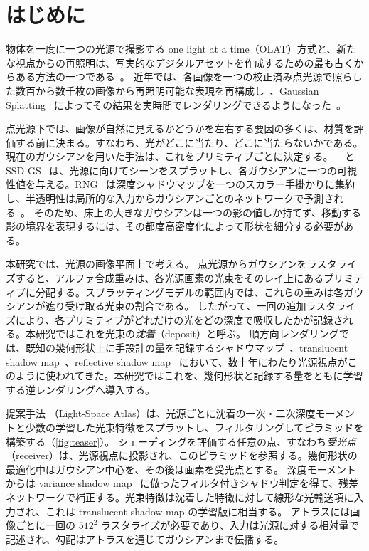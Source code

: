 \section{はじめに}
\label{sec:intro}

物体を一度に一つの光源で撮影する one light at a time（OLAT）方式と、新たな視点からの再照明は、写実的なデジタルアセットを作成するための最も古くからある方法の一つである~\cite{debevec2000acquiring}。
近年では、各画像を一つの校正済み点光源で照らした数百から数千枚の画像から再照明可能な表現を再構成し~\cite{bi2020neural,zeng2023nrhints}、Gaussian Splatting~\cite{kerbl20233d} によってその結果を実時間でレンダリングできるようになった~\cite{bi2024gs3,kuang2024olat,fan2025rng,liu2025bigs,zheng2026ssdgs}。

点光源下では、画像が自然に見えるかどうかを左右する要因の多くは、材質を評価する前に決まる。すなわち、光がどこに当たり、どこに当たらないかである。
現在のガウシアンを用いた手法は、これをプリミティブごとに決定する。
\gsthree~\cite{bi2024gs3} と SSD-GS~\cite{zheng2026ssdgs} は、光源に向けてシーンをスプラットし、各ガウシアンに一つの可視性値を与える。RNG~\cite{fan2025rng} は深度シャドウマップを一つのスカラー手掛かりに集約し、半透明性は局所的な入力からガウシアンごとのネットワークで予測される~\cite{dihlmann2024sss,zheng2026ssdgs}。
そのため、床上の大きなガウシアンは一つの影の値しか持てず、移動する影の境界を表現するには、その都度高密度化によって形状を細分する必要がある。

本研究では、光源の画像平面上で考える。
点光源からガウシアンをラスタライズすると、アルファ合成重みは、各光源画素の光束をそのレイ上にあるプリミティブに分配する。スプラッティングモデルの範囲内では、これらの重みは各ガウシアンが遮り受け取る光束の割合である。
したがって、一回の追加ラスタライズにより、各プリミティブがどれだけの光をどの深度で吸収したかが記録される。本研究ではこれを光束の\emph{沈着}（deposit）と呼ぶ。
順方向レンダリングでは、既知の幾何形状上に手設計の量を記録するシャドウマップ~\cite{williams1978casting,donnelly2006variance,peters2015moment}、translucent shadow map~\cite{dachsbacher2003translucent}、reflective shadow map~\cite{dachsbacher2005reflective} において、数十年にわたり光源視点がこのように使われてきた。本研究ではこれを、幾何形状と記録する量をともに学習する逆レンダリングへ導入する。

提案手法 \ours（Light-Space Atlas）は、光源ごとに沈着の一次・二次深度モーメントと少数の学習した光束特徴をスプラットし、フィルタリングしてピラミッドを構築する（\cref{fig:teaser}）。
シェーディングを評価する任意の点、すなわち\emph{受光点}（receiver）は、光源視点に投影され、このピラミッドを参照する。幾何形状の最適化中はガウシアン中心を、その後は画素を受光点とする。
深度モーメントからは variance shadow map~\cite{donnelly2006variance} に倣ったフィルタ付きシャドウ判定を得て、残差ネットワークで補正する。光束特徴は沈着した特徴に対して線形な光輸送項に入力され、これは translucent shadow map の学習版に相当する。
アトラスには画像ごとに一回の $512^2$ ラスタライズが必要であり、入力は光源に対する相対量で記述され、勾配はアトラスを通じてガウシアンまで伝播する。


